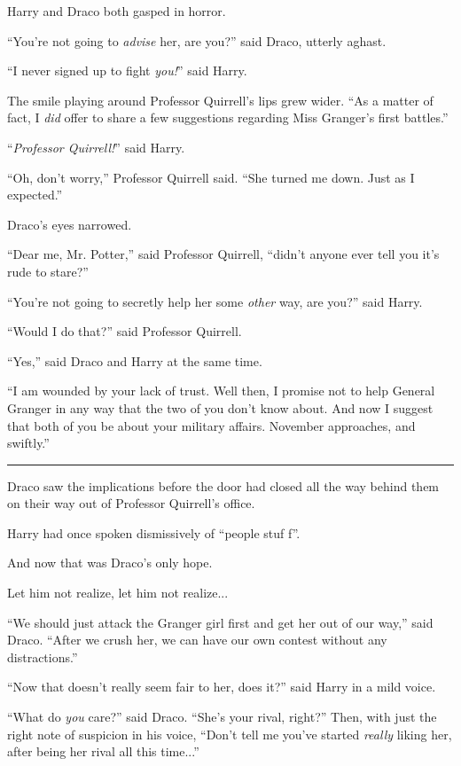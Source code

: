Harry and Draco both gasped in horror.

``You're not going to \emph{advise} her, are you?'' said Draco, utterly aghast.

``I never signed up to fight \emph{you!}'' said Harry.

The smile playing around Professor Quirrell's lips grew wider. ``As a matter of fact, I \emph{did} offer to share a few suggestions regarding Miss Granger's first battles.''

``\emph{Professor Quirrell!}'' said Harry.

``Oh, don't worry,'' Professor Quirrell said. ``She turned me down. Just as I expected.''

Draco's eyes narrowed.

``Dear me, Mr. Potter,'' said Professor Quirrell, ``didn't anyone ever tell you it's rude to stare?''

``You're not going to secretly help her some \emph{other} way, are you?'' said Harry.

``Would I do that?'' said Professor Quirrell.

``Yes,'' said Draco and Harry at the same time.

``I am wounded by your lack of trust. Well then, I promise not to help General Granger in any way that the two of you don't know about. And now I suggest that both of you be about your military affairs. November approaches, and swiftly.''

\begin{center}\rule{3in}{0.4pt}\end{center}

Draco saw the implications before the door had closed all the way behind them on their way out of Professor Quirrell's office.

Harry had once spoken dismissively of ``people stuf f''.

And now that was Draco's only hope.

Let him not realize, let him not realize...

``We should just attack the Granger girl first and get her out of our way,'' said Draco. ``After we crush her, we can have our own contest without any distractions.''

``Now that doesn't really seem fair to her, does it?'' said Harry in a mild voice.

``What do \emph{you} care?'' said Draco. ``She's your rival, right?'' Then, with just the right note of suspicion in his voice, ``Don't tell me you've started \emph{really} liking her, after being her rival all this time...''

